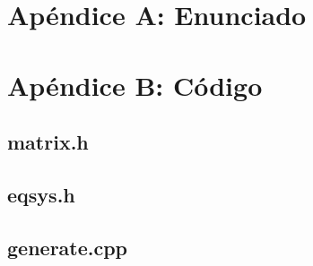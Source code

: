\documentclass[10pt,a4paper]{article}
\begin{document}

\newpage
\tableofcontents
\newpage



\newpage

\newpage

\newpage

\newpage

\section{Apéndice A: Enunciado}

\pagebreak
\section{Apéndice B: Código}
\subsection{matrix.h}

\subsection{eqsys.h}

\subsection{generate.cpp}

%
%
\end{document}
